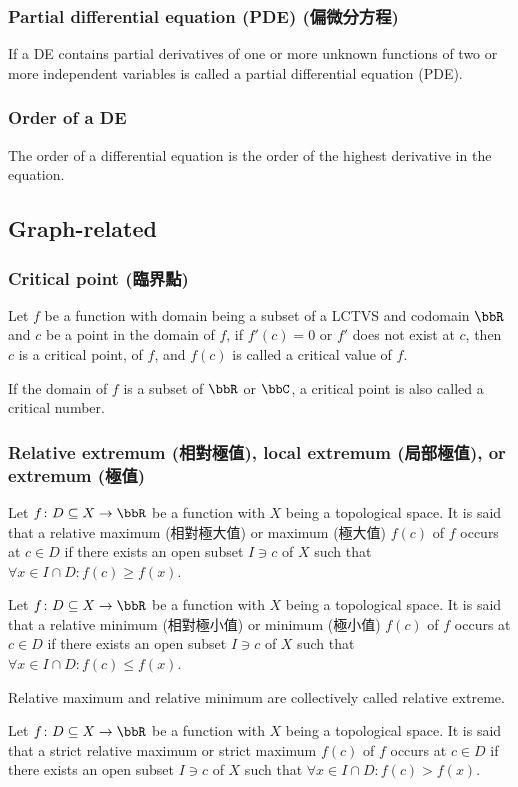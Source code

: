 \subsubsection{Partial differential equation (PDE) (偏微分方程)}
If a DE contains partial derivatives of one or more unknown functions of two or more independent variables is called a partial differential equation (PDE).
\subsubsection{Order of a DE}
The order of a differential equation is the order of the highest derivative in the equation.
\subsection{Graph-related}
\subsubsection{Critical point (臨界點)}
Let $f$ be a function with domain being a subset of a LCTVS and codomain $\bbR$ and \( c \) be a point in the domain of $f$, if \( f'(c) = 0 \) or \( f' \) does not exist at \( c \), then \( c \) is a critical point, of \( f \), and $f(c)$ is called a critical value of $f$.

If the domain of $f$ is a subset of $\bbR$ or $\bbC$, a critical point is also called a critical number.
\subsubsection{Relative extremum (相對極值), local extremum (局部極值), or extremum (極值)}
Let $f\colon D\subseteq X\to\bbR$ be a function with $X$ being a topological space. It is said that a relative maximum (相對極大值) or maximum (極大值) \( f(c) \) of \(f\) occurs at $c\in D$ if there exists an open subset $I\ni c$ of $X$ such that \( \forall x\in I\cap D\colon f(c) \geq f(x) \).

Let $f\colon D\subseteq X\to\bbR$ be a function with $X$ being a topological space. It is said that a relative minimum (相對極小值) or minimum (極小值) \( f(c) \) of \(f\) occurs at $c\in D$ if there exists an open subset $I\ni c$ of $X$ such that \( \forall x\in I\cap D\colon f(c) \leq f(x) \).

Relative maximum and relative minimum are collectively called relative extreme.

Let $f\colon D\subseteq X\to\bbR$ be a function with $X$ being a topological space. It is said that a strict relative maximum or strict maximum \( f(c) \) of \(f\) occurs at $c\in D$ if there exists an open subset $I\ni c$ of $X$ such that \( \forall x\in I\cap D\colon f(c) > f(x) \).

